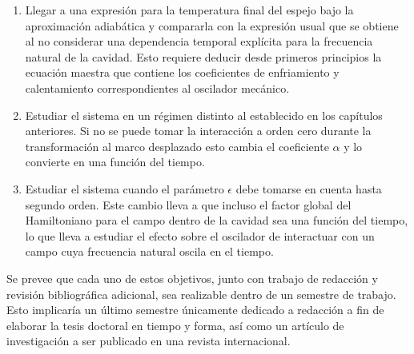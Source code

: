 \documentclass[10pt,a4paper]{report}
\begin{document}
\begin{enumerate}
\item Llegar a una expresión para la temperatura final del espejo bajo la aproximación adiabática y compararla con la expresión usual que se obtiene al no considerar una dependencia temporal explícita para la frecuencia natural de la cavidad. Esto requiere deducir desde primeros principios la ecuación maestra que contiene los coeficientes de enfriamiento y calentamiento correspondientes al oscilador mecánico.

\item Estudiar el sistema en un régimen distinto al establecido en los capítulos anteriores. Si no se puede tomar la interacción a orden cero durante la transformación al marco desplazado esto cambia el coeficiente $\alpha$ y lo convierte en una función del tiempo.

\item Estudiar el sistema cuando el parámetro $\epsilon$ debe tomarse en cuenta hasta segundo orden. Este cambio lleva a que incluso el factor global del Hamiltoniano para el campo dentro de la cavidad sea una función del tiempo, lo que lleva a estudiar el efecto sobre el oscilador de interactuar con un campo cuya frecuencia natural oscila en el tiempo. 
\end{enumerate}

Se prevee que cada uno de estos objetivos, junto con trabajo de redacción y revisión bibliográfica adicional, sea realizable dentro de un semestre de trabajo. Esto implicaría un último semestre únicamente dedicado a redacción a fin de elaborar la tesis doctoral en tiempo y forma, así como un artículo de investigación a ser publicado en una revista internacional.











\end{document}
